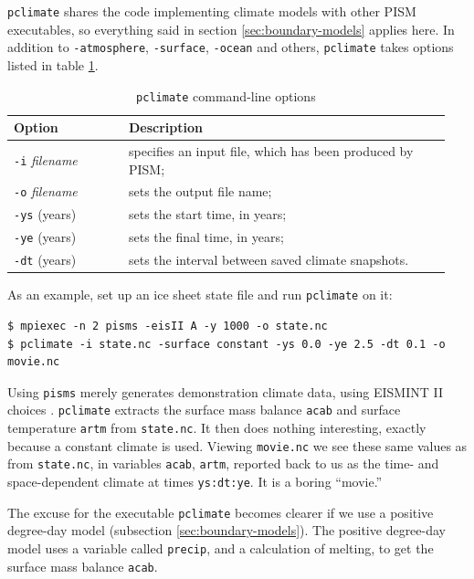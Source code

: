 \documentclass[titlepage,letterpaper,final]{scrartcl}
\newcommand{\txtopt}[2]{\texttt{-#1} #2\optindex{\texttt{-#1} #2}}
\newcommand{\fileopt}[1]{\txtopt{#1}{\emph{filename}}}
\begin{document}
\texttt{pclimate} shares the code implementing climate models with other PISM
executables, so everything said in section \ref{sec:boundary-models} applies
here. In addition to \texttt{-atmosphere}, \texttt{-surface}, \texttt{-ocean}
and others, \texttt{pclimate} takes options listed in table \ref{tab:pclimate}.

\begin{table}[ht]
  \centering
  \caption{\texttt{pclimate} command-line options}
  \begin{tabular}{p{0.25\linewidth}p{0.7\linewidth}}\toprule
    \textbf{Option} & \textbf{Description}\\
    \midrule
    \fileopt{i} & specifies an input file, which has been produced by PISM;\\
    \fileopt{o} & sets the output file name;\\
    \txtopt{ys}{(years)} & sets the start time, in years;\\
    \txtopt{ye}{(years)} & sets the final time, in years;\\
    \txtopt{dt}{(years)} & sets the interval between saved climate snapshots.\\
    \bottomrule
 \end{tabular}
 \label{tab:pclimate}
\end{table}

\bigskip
As an example, set up an ice sheet state file and run \texttt{pclimate} on it:
\begin{verbatim}
$ mpiexec -n 2 pisms -eisII A -y 1000 -o state.nc
$ pclimate -i state.nc -surface constant -ys 0.0 -ye 2.5 -dt 0.1 -o movie.nc
\end{verbatim}
Using \texttt{pisms} merely generates demonstration climate data, using
EISMINT II choices \cite{EISMINT00}.  \texttt{pclimate} extracts the 
surface mass balance \texttt{acab} and surface temperature \texttt{artm} from \texttt{state.nc}.
It then does nothing interesting, exactly because a constant climate
is used.  Viewing \texttt{movie.nc} we see these same values as from \texttt{state.nc},
in variables \texttt{acab}, \texttt{artm}, reported back to us as the time- and space-dependent
climate at times \texttt{ys:dt:ye}.  It is a boring ``movie.''

The excuse for the executable \texttt{pclimate} becomes clearer if we use a positive degree-day
model (subsection \ref{sec:boundary-models}).  The positive degree-day
model uses a variable called \texttt{precip}, and a calculation of melting, to get the
surface mass balance \texttt{acab}. 
\end{document}
